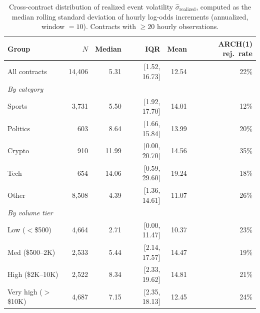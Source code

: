 \begin{table}[H]
\centering
\small
\caption{Cross-contract distribution of realized event volatility $\hat{\sigma}_{\text{realized}}$, computed as the median rolling standard deviation of hourly log-odds increments (annualized, window $= 10$). Contracts with $\geq 20$ hourly observations.}
\label{tab:eiv_summary}
\begin{tabular}{lrrrrr}
\toprule
Group & $N$ & Median & IQR & Mean & ARCH(1) rej.\ rate \\
\midrule
All contracts & 14,406 & 5.31 & [1.52, 16.73] & 12.54 & 22\% \\
\midrule
\textit{By category} & & & & & \\
\quad Sports & 3,731 & 5.50 & [1.92, 17.70] & 14.01 & 12\% \\
\quad Politics & 603 & 8.64 & [1.66, 15.84] & 13.99 & 20\% \\
\quad Crypto & 910 & 11.99 & [0.00, 20.70] & 14.56 & 35\% \\
\quad Tech & 654 & 14.06 & [0.59, 29.60] & 19.24 & 18\% \\
\quad Other & 8,508 & 4.39 & [1.36, 14.61] & 11.07 & 26\% \\
\midrule
\textit{By volume tier} & & & & & \\
\quad Low ($<$\$500) & 4,664 & 2.71 & [0.00, 11.47] & 10.37 & 23\% \\
\quad Med (\$500--2K) & 2,533 & 5.44 & [2.14, 17.57] & 14.47 & 19\% \\
\quad High (\$2K--10K) & 2,522 & 8.34 & [2.33, 19.62] & 14.81 & 21\% \\
\quad Very high ($>$\$10K) & 4,687 & 7.15 & [2.35, 18.13] & 12.45 & 24\% \\
\bottomrule
\end{tabular}
\end{table}
